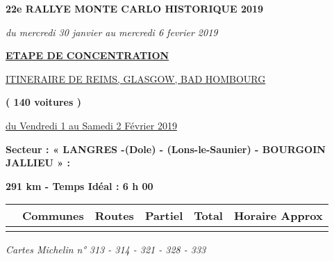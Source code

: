 \documentclass{article}%
\begin{document}
%
\normalsize%
\begin{center} \textbf{\LARGE{22e RALLYE MONTE CARLO HISTORIQUE 2019}} \end{center}%
\begin{flushleft} \textit{du mercredi 30 janvier au mercredi 6 fevrier 2019} \end{flushleft}%
\begin{center} \textbf{\underline{ETAPE DE CONCENTRATION}} \end{center}%
\begin{center} \underline{ITINERAIRE DE  REIMS, GLASGOW, BAD HOMBOURG} \end{center}%
\begin{center} \textbf{( 140 voitures )} \end{center}%
\begin{flushright} \underline{du  Vendredi 1 au Samedi 2 Février 2019} \end{flushright}%
\begin{flushleft} \textbf{Secteur : « LANGRES -(Dole) - (Lons-le-Saunier) - BOURGOIN  JALLIEU » :
} \end{flushleft}%
\begin{flushright} \textbf{291 km - Temps Idéal : 6 h 00
} \end{flushright}%
\begin{longtable}{p{2.25cm}|p{7.0cm}|p{1.5cm}|p{1.5cm}|p{1.5cm}|p{3.5cm}}%
\hline%
&Communes&Routes&Partiel&Total&Horaire Approx\\%
\hline%
\endhead%
\endfoot%
\endlastfoot%
\hline%
\end{longtable}%
\begin{flushleft} \textit{Cartes Michelin n° 
313 - 314 - 321 - 328 - 333
} \end{flushleft}%
\end{document}
